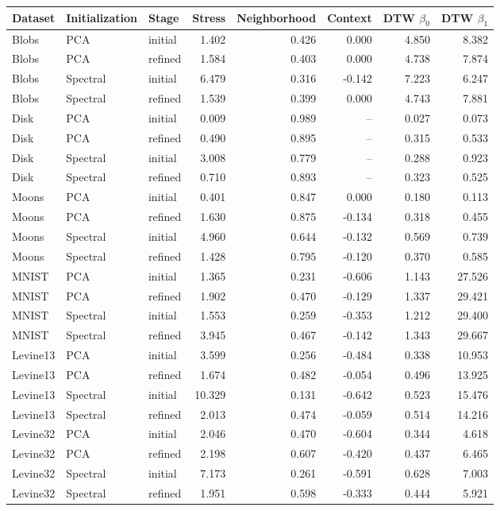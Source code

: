 \begin{tabular}{@{}lllrrrrr@{}}
\toprule
Dataset & Initialization & Stage & Stress & Neighborhood & Context & DTW $\beta_0$ & DTW $\beta_1$ \\
\midrule
Blobs & PCA & initial & 1.402 & 0.426 & 0.000 & 4.850 & 8.382 \\
Blobs & PCA & refined & 1.584 & 0.403 & 0.000 & 4.738 & 7.874 \\
Blobs & Spectral & initial & 6.479 & 0.316 & -0.142 & 7.223 & 6.247 \\
Blobs & Spectral & refined & 1.539 & 0.399 & 0.000 & 4.743 & 7.881 \\
\addlinespace
Disk & PCA & initial & 0.009 & 0.989 & -- & 0.027 & 0.073 \\
Disk & PCA & refined & 0.490 & 0.895 & -- & 0.315 & 0.533 \\
Disk & Spectral & initial & 3.008 & 0.779 & -- & 0.288 & 0.923 \\
Disk & Spectral & refined & 0.710 & 0.893 & -- & 0.323 & 0.525 \\
\addlinespace
Moons & PCA & initial & 0.401 & 0.847 & 0.000 & 0.180 & 0.113 \\
Moons & PCA & refined & 1.630 & 0.875 & -0.134 & 0.318 & 0.455 \\
Moons & Spectral & initial & 4.960 & 0.644 & -0.132 & 0.569 & 0.739 \\
Moons & Spectral & refined & 1.428 & 0.795 & -0.120 & 0.370 & 0.585 \\
\addlinespace
MNIST & PCA & initial & 1.365 & 0.231 & -0.606 & 1.143 & 27.526 \\
MNIST & PCA & refined & 1.902 & 0.470 & -0.129 & 1.337 & 29.421 \\
MNIST & Spectral & initial & 1.553 & 0.259 & -0.353 & 1.212 & 29.400 \\
MNIST & Spectral & refined & 3.945 & 0.467 & -0.142 & 1.343 & 29.667 \\
\addlinespace
Levine13 & PCA & initial & 3.599 & 0.256 & -0.484 & 0.338 & 10.953 \\
Levine13 & PCA & refined & 1.674 & 0.482 & -0.054 & 0.496 & 13.925 \\
Levine13 & Spectral & initial & 10.329 & 0.131 & -0.642 & 0.523 & 15.476 \\
Levine13 & Spectral & refined & 2.013 & 0.474 & -0.059 & 0.514 & 14.216 \\
\addlinespace
Levine32 & PCA & initial & 2.046 & 0.470 & -0.604 & 0.344 & 4.618 \\
Levine32 & PCA & refined & 2.198 & 0.607 & -0.420 & 0.437 & 6.465 \\
Levine32 & Spectral & initial & 7.173 & 0.261 & -0.591 & 0.628 & 7.003 \\
Levine32 & Spectral & refined & 1.951 & 0.598 & -0.333 & 0.444 & 5.921 \\
\bottomrule
\end{tabular}
